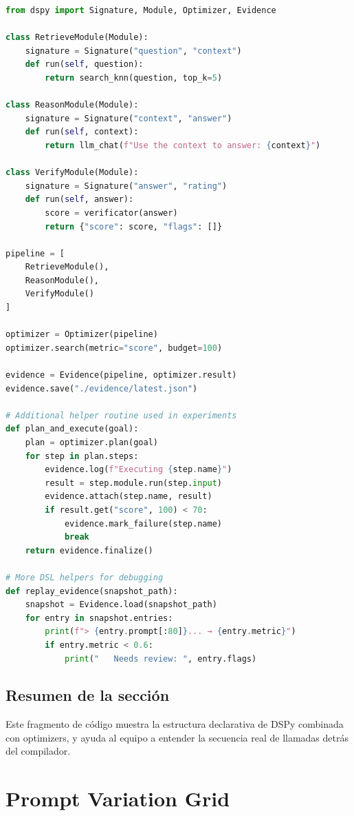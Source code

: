 \documentclass[a4paper]{article}
\begin{document}
\begin{lstlisting}[language=Python]
from dspy import Signature, Module, Optimizer, Evidence

class RetrieveModule(Module):
    signature = Signature("question", "context")
    def run(self, question):
        return search_knn(question, top_k=5)

class ReasonModule(Module):
    signature = Signature("context", "answer")
    def run(self, context):
        return llm_chat(f"Use the context to answer: {context}")

class VerifyModule(Module):
    signature = Signature("answer", "rating")
    def run(self, answer):
        score = verificator(answer)
        return {"score": score, "flags": []}

pipeline = [
    RetrieveModule(),
    ReasonModule(),
    VerifyModule()
]

optimizer = Optimizer(pipeline)
optimizer.search(metric="score", budget=100)

evidence = Evidence(pipeline, optimizer.result)
evidence.save("./evidence/latest.json")

# Additional helper routine used in experiments
def plan_and_execute(goal):
    plan = optimizer.plan(goal)
    for step in plan.steps:
        evidence.log(f"Executing {step.name}")
        result = step.module.run(step.input)
        evidence.attach(step.name, result)
        if result.get("score", 100) < 70:
            evidence.mark_failure(step.name)
            break
    return evidence.finalize()

# More DSL helpers for debugging
def replay_evidence(snapshot_path):
    snapshot = Evidence.load(snapshot_path)
    for entry in snapshot.entries:
        print(f"> {entry.prompt[:80]}... → {entry.metric}")
        if entry.metric < 0.6:
            print("   Needs review: ", entry.flags)
\end{lstlisting}

\subsection{Resumen de la sección}

Este fragmento de código muestra la estructura declarativa de DSPy combinada con optimizers, y ayuda al equipo a entender la secuencia real de llamadas detrás del compilador.

\section{Prompt Variation Grid}
\end{document}

